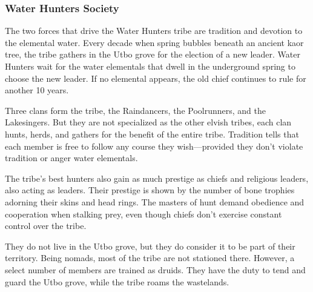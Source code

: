 \subsubsection{Water Hunters Society}
The two forces that drive the Water Hunters tribe are tradition and devotion to the elemental water. Every decade when spring bubbles beneath an ancient kaor tree, the tribe gathers in the Utbo grove for the election of a new leader. Water Hunters wait for the water elementals that dwell in the underground spring to choose the new leader. If no elemental appears, the old chief continues to rule for another 10 years.

Three clans form the tribe, the Raindancers, the Poolrunners, and the Lakesingers. But they are not specialized as the other elvish tribes, each clan hunts, herds, and gathers for the benefit of the entire tribe. Tradition tells that each member is free to follow any course they wish---provided they don't violate tradition or anger water elementals.

The tribe's best hunters also gain as much prestige as chiefs and religious leaders, also acting as leaders. Their prestige is shown by the number of bone trophies adorning their skins and head rings. The masters of hunt demand obedience and cooperation when stalking prey, even though chiefs don't exercise constant control over the tribe.

They do not live in the Utbo grove, but they do consider it to be part of their territory. Being nomads, most of the tribe are not stationed there. However, a select number of members are trained as druids. They have the duty to tend and guard the Utbo grove, while the tribe roams the wastelands.
